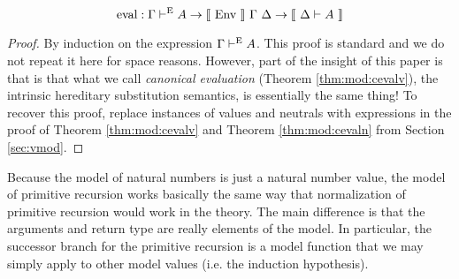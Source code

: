 \documentclass{llncs}
\newcommand{\refthm}[1]{Theorem \ref{thm:#1}}
\newcommand{\refsec}[1]{Section \ref{sec:#1}}
\def\marr{\rightarrow}
\newcommand{\turn}[1]{\vdash^\con{#1}}
\newcommand{\el}[1]{\llbracket ~ #1 ~ \rrbracket}
\newcommand{\con}[1]{\textmd{#1}}
\newcommand{\fun}[1]{\textmd{#1}}
\newcommand{\dtypm}[1]{\el{\Delta \vdash #1}}
\newcommand{\type}[1]{\Gamma \turn{E} #1}
\def\menv{\el{\fun{Env}}~\Gamma~\Delta}
\begin{document}
\begin{theorem}[Evaluation]
\label{thm:eval}
$$
\fun{eval} : \type{A} \marr \menv \marr \dtypm{A}
$$

\begin{proof}

By induction on the expression $\type{A}$. This proof is standard and
we do not repeat it here for space reasons. However, part of the
insight of this paper is that is that what we call
\textit{canonical evaluation} (\refthm{mod:cevalv}), the intrinsic hereditary substitution
semantics, is essentially the same thing! To recover this proof,
replace instances of values and neutrals with expressions in the proof
of \refthm{mod:cevalv} and \refthm{mod:cevaln} from \refsec{vmod}.

\end{proof}

\end{theorem}

Because the model of natural numbers is just a natural number value,
the model of primitive recursion works basically the same way that
normalization of primitive recursion would work in the theory. The
main difference is that the arguments and return type are really
elements of the model. In particular, the successor branch for the
primitive recursion is a model function that we may simply apply to
other model values (i.e. the induction hypothesis).
\end{document}
